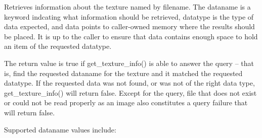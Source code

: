 
Retrieves information about the texture named by {\cf filename}.
The {\cf dataname} is a keyword indcating what information should
be retrieved, {\cf datatype} is the type of data expected, and
{\cf data} points to caller-owned memory where the results should be
placed.  It is up to the caller to ensure that {\cf data} contains
enough space to hold an item of the requested {\cf datatype}.

The return value is {\cf true} if {\cf get_texture_info()} is able to answer
the query -- that is, find the requested {\cf dataname} for the texture and
it matched the requested {\cf datatype}.  If the requested data was not
found, or was not of the right data type, {\cf get_texture_info()} will
return {\cf false}. Except for the  query, file that does not
exist or could not be read properly as an image also constitutes a query
failure that will return {\cf false}.

Supported {\cf dataname} values include:

